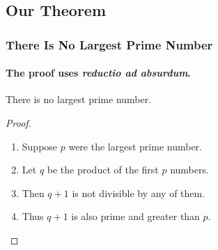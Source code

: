 \documentclass[10pt]{beamer}
\begin{document}
		\subsection{Our Theorem}
		\begin{frame}
			\frametitle{There Is No Largest Prime Number}
			\framesubtitle{The proof uses \textit{reductio ad absurdum}.}
			\begin{theorem}
					There is no largest prime number.
			\end{theorem}
			\begin{proof}
				\begin{enumerate}
					\item<1-| alert@1> Suppose $p$ were the largest
							 prime number.
					\item<2-> Let $q$ be the product of the first $p$ 
							 	numbers.
					\item<3-> Then $q+1$ is not divisible by any of them.
					\item<4-> Thus $q+1$ is also prime and greater than 
								$p$.\qedhere
				\end{enumerate}
			\end{proof}
		\end{frame}
		
		
\end{document}

